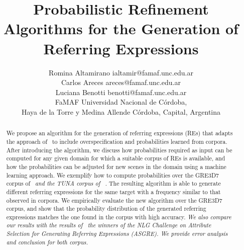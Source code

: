 \documentclass[jair,twoside,11pt,theapa]{article}
\begin{document}
\title{Probabilistic Refinement Algorithms
for the Generation of Referring Expressions}

\author{\name Romina Altamirano \email ialtamir@famaf.unc.edu.ar \\
       \name Carlos Areces \email areces@famaf.unc.edu.ar \\
       \name Luciana Benotti \email benotti@famaf.unc.edu.ar \\ 
       \addr FaMAF Universidad Nacional de C\'ordoba, \\
       Haya de la Torre y Medina Allende
       C\'ordoba, Capital, Argentina
}


\maketitle


\begin{abstract}
We propose an algorithm for the generation of referring expressions (REs) that adapts the approach of~ 
to include overspecification and probabilities learned from corpora.  After introducing the algorithm, we discuss how probabilities required as 
input can be computed for any given domain for which a suitable corpus of REs is available, and how the probabilities can be adjusted for new scenes in the domain using a machine learning approach.  
We exemplify how to compute probabilities over the GRE3D7 corpus of~ \textit{and the TUNA corpus of ~}.
The resulting algorithm is able to generate different referring expressions for the same target with a frequency similar to that observed in corpora. 
We empirically evaluate the new algorithm over the GRE3D7 corpus, and show that the probability distribution of the generated referring expressions 
matches the one found in the corpus with high accuracy. \textit{We also compare our results with the results of~ the winners of the NLG Challenge on Attribute Selection for Generating Referring Expressions (ASGRE). We provide error analysis and conclusion for both corpus. }

\end{abstract}
\end{document}

